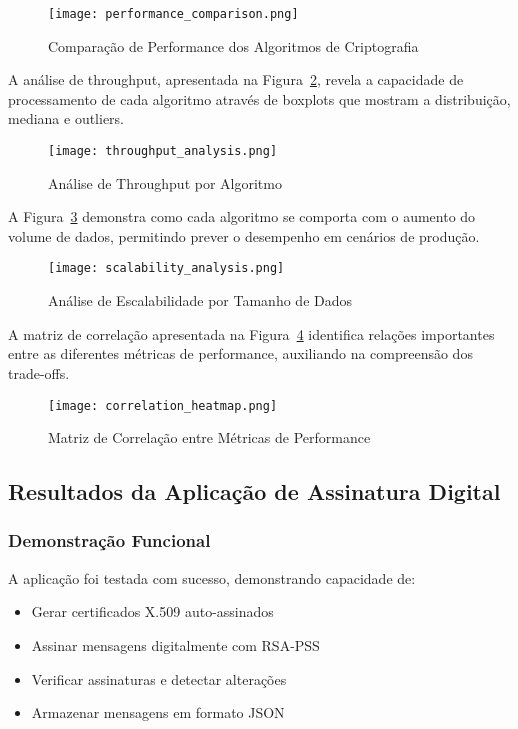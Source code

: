 \documentclass[12pt,a4paper,oneside]{article}
\begin{document}
\begin{figure}[H]
\centering
\texttt{[image: performance\_comparison.png]}
\caption{Comparação de Performance dos Algoritmos de Criptografia}
\label{fig:performance}
\end{figure}

A análise de throughput, apresentada na Figura~\ref{fig:throughput}, revela a capacidade de processamento de cada algoritmo através de boxplots que mostram a distribuição, mediana e outliers.

\begin{figure}[H]
\centering
\texttt{[image: throughput\_analysis.png]}
\caption{Análise de Throughput por Algoritmo}
\label{fig:throughput}
\end{figure}

A Figura~\ref{fig:scalability} demonstra como cada algoritmo se comporta com o aumento do volume de dados, permitindo prever o desempenho em cenários de produção.

\begin{figure}[H]
\centering
\texttt{[image: scalability\_analysis.png]}
\caption{Análise de Escalabilidade por Tamanho de Dados}
\label{fig:scalability}
\end{figure}

A matriz de correlação apresentada na Figura~\ref{fig:correlation} identifica relações importantes entre as diferentes métricas de performance, auxiliando na compreensão dos trade-offs.

\begin{figure}[H]
\centering
\texttt{[image: correlation\_heatmap.png]}
\caption{Matriz de Correlação entre Métricas de Performance}
\label{fig:correlation}
\end{figure}

\subsection{Resultados da Aplicação de Assinatura Digital}

\subsubsection{Demonstração Funcional}

A aplicação foi testada com sucesso, demonstrando capacidade de:

\begin{itemize}
    \item Gerar certificados X.509 auto-assinados
    \item Assinar mensagens digitalmente com RSA-PSS
    \item Verificar assinaturas e detectar alterações
    \item Armazenar mensagens em formato JSON
\end{itemize}
\end{document}
